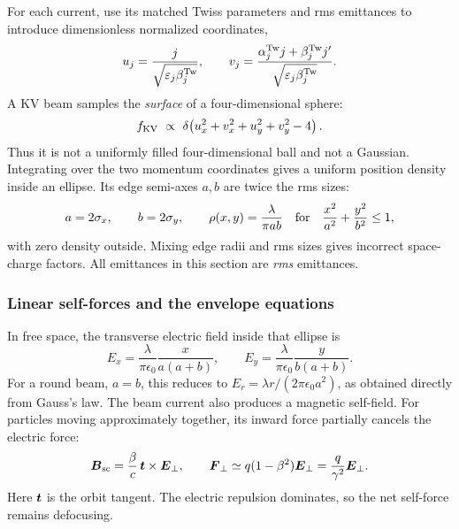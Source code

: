 For each current, use its matched Twiss parameters and rms emittances to
introduce dimensionless normalized coordinates,
\begin{equation}
 u_j=\frac{j}{\sqrt{\varepsilon_j\beta_j^{\rm Tw}}},\qquad
 v_j=\frac{\alpha_j^{\rm Tw}j+\beta_j^{\rm Tw}j'}
              {\sqrt{\varepsilon_j\beta_j^{\rm Tw}}}.
 \label{eq:sc-normalized}
\end{equation}
A KV beam samples the \emph{surface} of a four-dimensional sphere:
\begin{equation}
 f_{\rm KV}\ \propto\
 \delta\!\left(u_x^2+v_x^2+u_y^2+v_y^2-4\right).
 \label{eq:sc-kv-shell}
\end{equation}
Thus it is not a uniformly filled four-dimensional ball and not a Gaussian.
Integrating over the two momentum coordinates gives a uniform position density
inside an ellipse. Its edge semi-axes $a,b$ are twice the rms sizes:
\begin{equation}
 a=2\sigma_x,\qquad b=2\sigma_y,\qquad
 \rho(x,y)=\frac{\lambda}{\pi a b}
 \quad\hbox{for}\quad \frac{x^2}{a^2}+\frac{y^2}{b^2}\leq1,
 \label{eq:sc-kv-density}
\end{equation}
with zero density outside. Mixing edge radii and rms sizes gives incorrect
space-charge factors. All emittances in this section are \emph{rms} emittances.

\subsubsection{Linear self-forces and the envelope equations}
In free space, the transverse electric field inside that ellipse is
\begin{equation}
 E_x=\frac{\lambda}{\pi\epsilon_0}\frac{x}{a(a+b)},\qquad
 E_y=\frac{\lambda}{\pi\epsilon_0}\frac{y}{b(a+b)}.
 \label{eq:sc-kv-field}
\end{equation}
For a round beam, $a=b$, this reduces to
$E_r=\lambda r/(2\pi\epsilon_0 a^2)$, as obtained directly from Gauss's law.
The beam current also produces a magnetic self-field. For particles moving
approximately together, its inward force partially cancels the electric force:
\begin{equation}
 \boldsymbol{B}_{\rm sc}=\frac{\beta}{c}\,\boldsymbol{t}\times\boldsymbol{E}_\perp,\qquad
 \boldsymbol{F}_\perp\simeq q(1-\beta^2)\boldsymbol{E}_\perp
                   =\frac{q}{\gamma^2}\boldsymbol{E}_\perp.
 \label{eq:sc-cancellation}
\end{equation}
Here $\boldsymbol{t}$ is the orbit tangent. The electric repulsion dominates, so the
net self-force remains defocusing.

